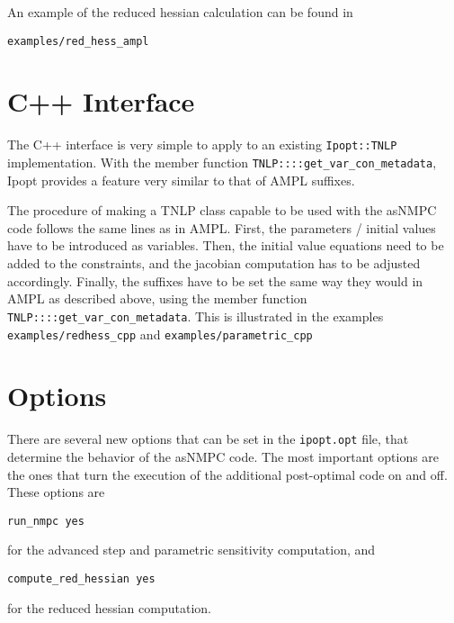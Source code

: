 \documentclass[a4paper]{article}
\begin{document}
An example of the reduced hessian calculation can be found in 
\begin{verbatim}
examples/red_hess_ampl
\end{verbatim}
\section{C++ Interface}
The C++ interface is very simple to apply to an existing {\tt Ipopt::TNLP} implementation. With the member function {\tt TNLP::::get\_var\_con\_metadata}, Ipopt provides a feature very similar to that of AMPL suffixes. 

The procedure of making a TNLP class capable to be used with the asNMPC code follows the same lines as in AMPL. First, the parameters / initial values have to be introduced as variables. Then, the initial value equations need to be added to the constraints, and the jacobian computation has to be adjusted accordingly. Finally, the suffixes have to be set the same way they would in AMPL as described above, using the member function {\tt TNLP::::get\_var\_con\_metadata}. This is illustrated in the examples {\tt examples/redhess\_cpp} and {\tt examples/parametric\_cpp}
\section{Options}
There are several new options that can be set in the {\tt ipopt.opt} file, that determine the behavior of the asNMPC code. The most important options are the ones that turn the execution of the additional post-optimal code on and off. These options are 
\begin{verbatim}
run_nmpc yes
\end{verbatim}
for the advanced step and parametric sensitivity computation, and
\begin{verbatim}
compute_red_hessian yes
\end{verbatim}
for the reduced hessian computation. 
\end{document}
